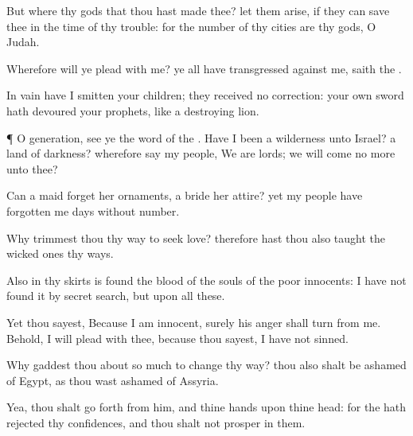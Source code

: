 {But where
{} thy
gods that thou hast
made thee? let them
arise, if they can
save thee in the
time of thy
trouble: for
{} the
number of thy
cities are thy
gods, O
Judah.


\par }{\PP {}Wherefore will ye
plead with me? ye all have
transgressed against me,
saith the
{}.

In
vain have I
smitten your
children; they
received no
correction: your own
sword hath
devoured your
prophets, like a
destroying
lion.


\par }{\PP {}¶ O
generation,
see ye the
word of the
{}. Have I been a
wilderness unto
Israel? a
land of
darkness? wherefore
say my
people, We are
lords; we will
come no more unto thee?

Can a
maid
forget her
ornaments,
{} a
bride her
attire? yet my
people have
forgotten me
days without
number.

Why
trimmest thou thy
way to
seek
love? therefore hast thou also
taught the wicked
ones thy
ways.

Also in thy
skirts is
found the
blood of the
souls of the
poor
innocents: I have not
found it by secret
search, but upon all these.

Yet thou
sayest, Because I am
innocent, surely his
anger shall
turn from me. Behold, I will
plead with thee, because thou
sayest, I have not
sinned.

Why gaddest thou
about so
much to
change thy
way? thou also shalt be
ashamed of
Egypt, as thou wast
ashamed of
Assyria.

Yea, thou shalt go
forth from him, and thine
hands upon thine
head: for the
{} hath
rejected thy
confidences, and thou shalt not
prosper in them.




\par }

